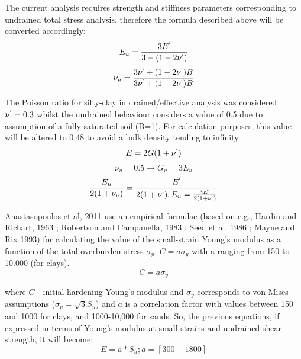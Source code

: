 \documentclass[11pt,a4paper]{report}
\begin{document}
The current analysis requires strength and stiffness parameters corresponding to undrained total stress analysis, therefore the formula described above will be converted accordingly: 
\begin{equation}
	E_u=\frac{3E^`}{3-(1-2\nu^`)}
\end{equation}
\begin{equation}
	\nu_u=\frac{3\nu^`+(1-2\nu^`)B}{3\nu^`+(1-2\nu^`)B}
\end{equation}
	
The Poisson ratio for silty-clay in drained/effective analysis was considered $\nu^`=0.3$ whilst the undrained behaviour considers a value of 0.5 due to assumption of a fully saturated soil (B=1). For calculation purposes, this value will be altered to 0.48 to avoid a bulk density tending to infinity. 
\begin{equation}
	E=2G(1+\nu^`)
\end{equation}
\begin{equation}
	\nu_u=0.5\longrightarrow G_u=3E_u
\end{equation}
\begin{equation}
	\frac{E_u}{2(1+\nu_u)}=\frac{E^`}{2(1+\nu^`); E_u=\frac{3E^`}{2(1+\nu^`)}}
\end{equation}

Anastasopoulos et al, 2011 \cite{anastasopoulos2011simplified} use an empirical formulae (based on e.g., Hardin and Richart, 1963 \cite{hardin1963elastic}; Robertson and Campanella, 1983 \cite{robertson1983interpretation}; Seed et al. 1986 \cite{seed1986use}; Mayne and Rix 1993) for calculating the value of the small-strain Young's modulus as a function of the total overburden stress $\sigma_y$. $C=a{\sigma }_{y}$ with a ranging from 150 to 10.000 (for clays). 
\begin{equation}
	C=a\sigma_y
\end{equation} 

where $C$ - initial hardening Young's modulus and $\sigma_y$ corresponds to von Mises assumptions ($\sigma_y=\sqrt3 S_u$) and $a$ is a correlation factor with values between 150 and 1000 for clays, and 1000-10,000 for sands. So, the previous equations, if expressed in terms of Young's modulus at small strains and undrained shear strength, it will become:
\begin{equation}
	E=a*S_u;   a=[300-1800]
\end{equation}
\end{document}
